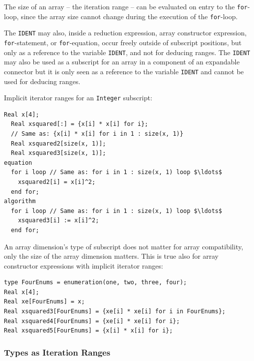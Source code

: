 \begin{nonnormative}
The size of an array -- the iteration range -- can be evaluated on entry to the \lstinline!for!-loop, since the array size cannot change during the execution of the \lstinline!for!-loop.
\end{nonnormative}

The \lstinline!IDENT! may also, inside a reduction expression, array constructor expression, \lstinline!for!-statement, or \lstinline!for!-equation, occur freely outside of subscript positions, but only as a reference to the variable \lstinline!IDENT!, and not for deducing ranges.
The \lstinline!IDENT! may also be used as a subscript for an array in a component of an expandable connector but it is only seen as a reference to the variable \lstinline!IDENT! and cannot be used for deducing ranges.

\begin{example}
Implicit iterator ranges for an \lstinline!Integer! subscript:
\begin{lstlisting}[language=modelica]
  Real x[4];
  Real xsquared[:] = {x[i] * x[i] for i};
  // Same as: {x[i] * x[i] for i in 1 : size(x, 1)}
  Real xsquared2[size(x, 1)];
  Real xsquared3[size(x, 1)];
equation
  for i loop // Same as: for i in 1 : size(x, 1) loop $\ldots$
    xsquared2[i] = x[i]^2;
  end for;
algorithm
  for i loop // Same as: for i in 1 : size(x, 1) loop $\ldots$
    xsquared3[i] := x[i]^2;
  end for;
\end{lstlisting}
\end{example}

\begin{example}
An array dimension's type of subscript does not matter for array compatibility, only the size of the array dimension matters.
This is true also for array constructor expressions with implicit iterator ranges:
\begin{lstlisting}[language=modelica]
type FourEnums = enumeration(one, two, three, four);
Real x[4];
Real xe[FourEnums] = x;
Real xsquared3[FourEnums] = {xe[i] * xe[i] for i in FourEnums};
Real xsquared4[FourEnums] = {xe[i] * xe[i] for i};
Real xsquared5[FourEnums] = {x[i] * x[i] for i};
\end{lstlisting}
\end{example}


\subsubsection{Types as Iteration Ranges}\label{types-as-iteration-ranges}


